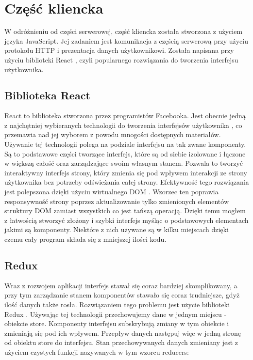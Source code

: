 \documentclass[shortabstract,inz]{iithesis}
\begin{document}
\section{Część kliencka}
W odróżnieniu od części serwerowej, część kliencka została stworzona z użyciem języka JavaScript. Jej zadaniem jest komunikacja z częścią serwerową przy użyciu protokołu HTTP i prezentacja danych użytkownikowi. Została napisana przy użyciu biblioteki React \citep{react}, czyli popularnego rozwiązania do tworzenia interfejsu użytkownika.
\subsection{Biblioteka React}
React to biblioteka stworzona przez programistów Facebooka. Jest obecnie jedną z najchętniej wybieranych technologii do tworzenia interfejsów użytkownika \citep{react-popularity}, co przemawia nad jej wyborem z powodu mnogości dostępnych materiałów. Używanie tej technologii polega na podziale interfejsu na tak zwane komponenty. Są to podstawowe części tworzące interfejs, które są od siebie izolowane i łączone w większą całość oraz zarządzające swoim własnym stanem. Pozwala to tworzyć interaktywny interfejs strony, który zmienia się pod wpływem interakcji ze strony użytkownika bez potrzeby odświeżania całej strony. Efektywność tego rozwiązania jest polepszona dzięki użyciu wirtualnego DOM \citep{virtual-dom}. Wzorzec ten poprawia responsywność strony poprzez aktualizowanie tylko zmienionych elementów struktury DOM \citep{dom} zamiast wszystkich co jest tańszą operacją. Dzięki temu mogłem z łatwością stworzyć złożony i szybki interfejs myśląc o podstawowych elementach jakimi są komponenty. Niektóre z nich używane są w kilku miejscach dzięki czemu cały program składa się z mniejszej ilości kodu.

\subsection{Redux}
Wraz z rozwojem aplikacji interfejs stawał się coraz bardziej skomplikowany, a przy tym zarządzanie stanem komponentów stawało się coraz trudniejsze, gdyż ilość danych także rosła. Rozwiązaniem tego problemu jest użycie biblioteki Redux \citep{redux}. Używając tej technologii przechowujemy dane w jednym miejscu - obiekcie store. Komponenty interfejsu subskrybują zmiany w tym obiekcie i zmieniają się pod ich wpływem. Przepływ danych następuj więc w jedną stronę od obiektu store do interfejsu. Stan przechowywanych danych zmieniany jest z użyciem czystych funkcji nazywanych w tym wzorcu reducers:
\end{document}

